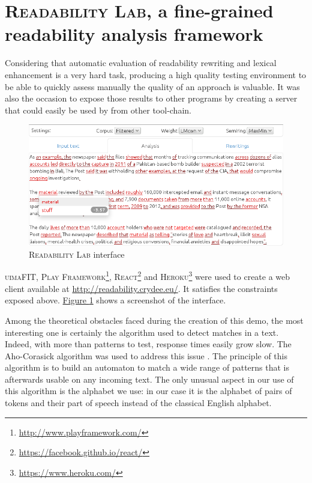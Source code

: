 \documentclass[a4paper, 11pt, onepage]{scrreprt}
\newcommand\figureref[1]{\hyperref[#1]{Figure \ref*{#1}}}
\begin{document}
\section{\textsc{Readability Lab}, a fine-grained readability analysis
  framework}
\label{sec:framework}

Considering that automatic evaluation of readability rewriting and
lexical enhancement is a very hard task, producing a high quality
testing environment to be able to quickly assess manually the quality
of an approach is valuable. It was also the occasion to expose those
results to other programs by creating a server that could easily be
used by from other tool-chain.

\begin{figure}[H]
  \centering
  \includegraphics[width=\textwidth]{ui}
  \caption{\textsc{Readability Lab} interface}
  \label{fig:ui}
\end{figure}

\textsc{uimaFIT}, \textsc{Play
  Framework}\footnote{\url{http://www.playframework.com/}},
\textsc{React}\footnote{\url{https://facebook.github.io/react/}} and
\textsc{Heroku}\footnote{\url{https://www.heroku.com/}} were used to
create a web client available at
\url{http://readability.crydee.eu/}. It satisfies the constraints
exposed above. \figureref{fig:ui} shows a screenshot of the interface.

Among the theoretical obstacles faced during the creation of this
demo, the most interesting one is certainly the algorithm used to
detect matches in a text. Indeed, with more than 
patterns to test, response times easily grow slow. The Aho-Corasick
algorithm was used to address this issue \cite{aho1975efficient}. The
principle of this algorithm is to build an automaton to match a wide
range of patterns that is afterwards usable on any incoming text. The
only unusual aspect in our use of this algorithm is the alphabet we
use: in our case it is the alphabet of pairs of tokens and their part
of speech instead of the classical English alphabet.
\end{document}
